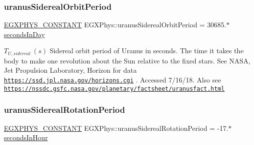 \subsubsection{\texorpdfstring{uranus\+Sidereal\+Orbit\+Period}{uranusSiderealOrbitPeriod}}
{\footnotesize\ttfamily \mbox{\hyperlink{group___e_g_x_phys-_constants-_macros_ga76980d288494ce1714c9ac68a95ba702}{E\+G\+X\+P\+H\+Y\+S\+\_\+\+C\+O\+N\+S\+T\+A\+NT}} E\+G\+X\+Phys\+::uranus\+Sidereal\+Orbit\+Period = 30685.$\ast$\mbox{\hyperlink{namespace_e_g_x_phys_a93d2a00d75411b58cbf63ab3fd1f8bc2}{seconds\+In\+Day}}}

$ T_{U,sidereal} \ (s)$ Sidereal orbit period of Uranus in seconds. The time it takes the body to make one revolution about the Sun relative to the fixed stars. See N\+A\+SA, Jet Propulsion Laboratory, Horizon for data \href{https://ssd.jpl.nasa.gov/horizons.cgi}{\tt https\+://ssd.\+jpl.\+nasa.\+gov/horizons.\+cgi} . Accessed 7/16/18. Also see \href{https://nssdc.gsfc.nasa.gov/planetary/factsheet/uranusfact.html}{\tt https\+://nssdc.\+gsfc.\+nasa.\+gov/planetary/factsheet/uranusfact.\+html} \mbox{\label{group___e_g_x_phys-_constants-_astrophysics-_solar_system-_uranus-_orbit_ga69a761e11c43df2e68ad5865561bd40a}} 
\subsubsection{\texorpdfstring{uranus\+Sidereal\+Rotation\+Period}{uranusSiderealRotationPeriod}}
{\footnotesize\ttfamily \mbox{\hyperlink{group___e_g_x_phys-_constants-_macros_ga76980d288494ce1714c9ac68a95ba702}{E\+G\+X\+P\+H\+Y\+S\+\_\+\+C\+O\+N\+S\+T\+A\+NT}} E\+G\+X\+Phys\+::uranus\+Sidereal\+Rotation\+Period = -\/17.$\ast$\mbox{\hyperlink{namespace_e_g_x_phys_a7c3165cd93e36f1fb8e9fef80f117bef}{seconds\+In\+Hour}}}

